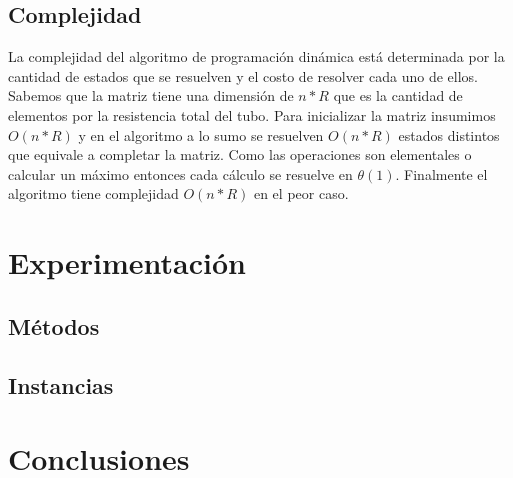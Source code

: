 \documentclass[10pt,a4paper]{article}
\begin{document}
\subsection{Complejidad}
La complejidad del algoritmo de programación dinámica está determinada por la cantidad de estados que se resuelven y el costo de resolver cada uno de ellos.
Sabemos que la matriz tiene una dimensión de $n * R$ que es la cantidad de elementos por la resistencia total del tubo. Para inicializar la matriz insumimos $O(n * R)$ y en el algoritmo a lo sumo se resuelven $O(n * R)$ estados distintos que equivale a completar la matriz. Como las operaciones son elementales o calcular un máximo entonces cada cálculo se resuelve en $\theta(1)$. Finalmente el algoritmo tiene complejidad $O(n * R)$ en el peor caso.

\section{Experimentación} \label{sec:experimentacion}

\subsection{Métodos}

\subsection{Instancias}


\section{Conclusiones} \label{sec:conclusiones}

\newpage

\end{document}
